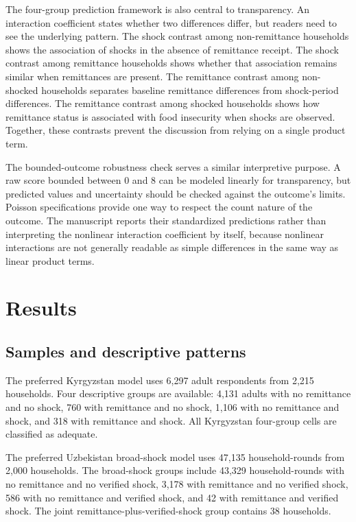 \documentclass[11pt]{article}
\begin{document}
The four-group prediction framework is also central to transparency. An interaction coefficient states whether two differences differ, but readers need to see the underlying pattern. The shock contrast among non-remittance households shows the association of shocks in the absence of remittance receipt. The shock contrast among remittance households shows whether that association remains similar when remittances are present. The remittance contrast among non-shocked households separates baseline remittance differences from shock-period differences. The remittance contrast among shocked households shows how remittance status is associated with food insecurity when shocks are observed. Together, these contrasts prevent the discussion from relying on a single product term.

The bounded-outcome robustness check serves a similar interpretive purpose. A raw score bounded between 0 and 8 can be modeled linearly for transparency, but predicted values and uncertainty should be checked against the outcome's limits. Poisson specifications provide one way to respect the count nature of the outcome. The manuscript reports their standardized predictions rather than interpreting the nonlinear interaction coefficient by itself, because nonlinear interactions are not generally readable as simple differences in the same way as linear product terms.

\section{Results}

\subsection{Samples and descriptive patterns}

The preferred Kyrgyzstan model uses 6,297 adult respondents from 2,215 households. Four descriptive groups are available: 4,131 adults with no remittance and no shock, 760 with remittance and no shock, 1,106 with no remittance and shock, and 318 with remittance and shock. All Kyrgyzstan four-group cells are classified as adequate.

The preferred Uzbekistan broad-shock model uses 47,135 household-rounds from 2,000 households. The broad-shock groups include 43,329 household-rounds with no remittance and no verified shock, 3,178 with remittance and no verified shock, 586 with no remittance and verified shock, and 42 with remittance and verified shock. The joint remittance-plus-verified-shock group contains 38 households.
\end{document}
